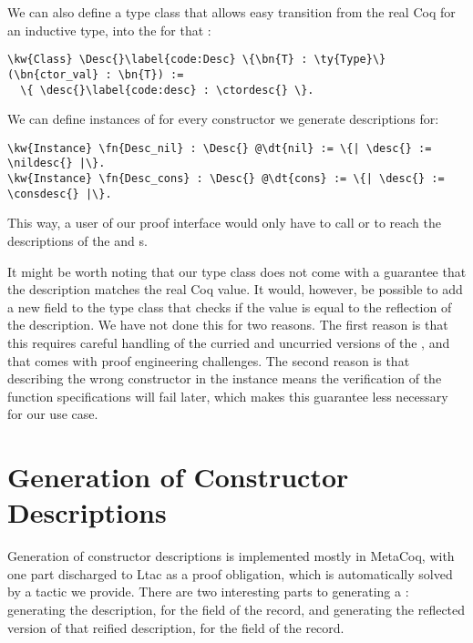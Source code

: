 We can also define a type class that allows easy transition from the real Coq \constructor{} for an \gls{inductive type}, into the \ctordesc{} for that \constructor{}:

\begin{Verbatim}
\kw{Class} \Desc{}\label{code:Desc} \{\bn{T} : \ty{Type}\} (\bn{ctor_val} : \bn{T}) :=
  \{ \desc{}\label{code:desc} : \ctordesc{} \}.
\end{Verbatim}

\newpage
We can define instances of \Desc{} for every constructor we generate descriptions for:

\begin{Verbatim}
\kw{Instance} \fn{Desc_nil} : \Desc{} @\dt{nil} := \{| \desc{} := \nildesc{} |\}.
\kw{Instance} \fn{Desc_cons} : \Desc{} @\dt{cons} := \{| \desc{} := \consdesc{} |\}.
\end{Verbatim}

This way, a user of our proof interface would only have to call  or  to reach the descriptions of the  and  \constructor{}s.

It might be worth noting that our \Desc{} type class does not come with a guarantee that the \reified{} description matches the real Coq value. It would, however, be possible to add a new field to the \Desc{} type class that checks if the  value is equal to the \gls{reflection} of the \reified{} description. We have not done this for two reasons. The first reason is that this requires careful handling of the curried and uncurried versions of the \constructor{}, and that comes with proof engineering challenges. The second reason is that describing the wrong constructor in the \Desc{} instance means the verification of the function specifications will fail later, which makes this guarantee less necessary for our use case.


\section{Generation of Constructor Descriptions}
\label{genctors}

Generation of constructor descriptions is implemented mostly in MetaCoq, with one part discharged to \gls{Ltac} as a proof obligation, which is automatically solved by a tactic we provide. There are two interesting parts to generating a \ctordesc{}: generating the \reified{} description, for the \ctorreified{} field of the \ctordesc{} record, and generating the reflected version of that reified description, for the \ctorreflected{} field of the \ctordesc{} record.

